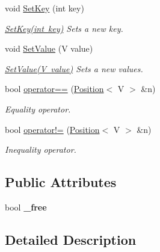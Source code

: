 \begin{DoxyCompactItemize}
void \mbox{\hyperlink{class_position_a7605869eac2d7796bab440c7ff306a2d}{Set\+Key}} (int key)
\begin{DoxyCompactList}\small\item\em \mbox{\hyperlink{class_position_a7605869eac2d7796bab440c7ff306a2d}{Set\+Key(int key)}} Sets a new key. \end{DoxyCompactList}\item 
void \mbox{\hyperlink{class_position_a643b913908871f0b8fa78345545983b0}{Set\+Value}} (V value)
\begin{DoxyCompactList}\small\item\em \mbox{\hyperlink{class_position_a643b913908871f0b8fa78345545983b0}{Set\+Value(\+V value)}} Sets a new values. \end{DoxyCompactList}\item 
\mbox{\label{class_position_a88f45cf6237d93a94dd02c77b8927041}} 
bool \mbox{\hyperlink{class_position_a88f45cf6237d93a94dd02c77b8927041}{operator==}} (\mbox{\hyperlink{class_position}{Position}}$<$ V $>$ \&n)
\begin{DoxyCompactList}\small\item\em Equality operator. \end{DoxyCompactList}\item 
\mbox{\label{class_position_a394dd0222cc3e695c5f1ce8b392824c0}} 
bool \mbox{\hyperlink{class_position_a394dd0222cc3e695c5f1ce8b392824c0}{operator!=}} (\mbox{\hyperlink{class_position}{Position}}$<$ V $>$ \&n)
\begin{DoxyCompactList}\small\item\em Inequality operator. \end{DoxyCompactList}\end{DoxyCompactItemize}
\subsection*{Public Attributes}
\begin{DoxyCompactItemize}
\item 
\mbox{\label{class_position_a6e08b0d04f66c466c7d487a049972c5b}} 
bool {\bfseries \+\_\+free}
\end{DoxyCompactItemize}


\subsection{Detailed Description}
